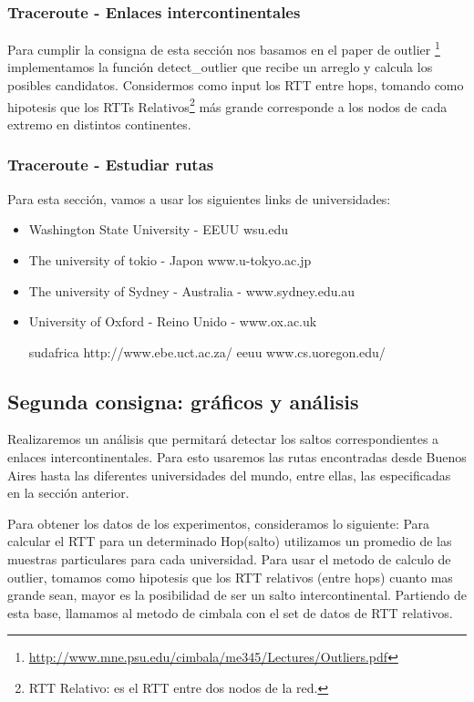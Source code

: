 \subsubsection{Traceroute - Enlaces intercontinentales}

Para cumplir la consigna de esta sección nos basamos en el paper de outlier \footnote{ \hyperref[Cimbala]{http://www.mne.psu.edu/cimbala/me345/Lectures/Outliers.pdf} } implementamos la función detect\_outlier que recibe un arreglo y calcula los posibles candidatos. Considermos como input los RTT entre hops, tomando como hipotesis que los RTTs Relativos\footnote{RTT Relativo: es el RTT entre dos nodos de la red.} más grande corresponde a los nodos de cada extremo en distintos continentes.

\subsubsection{Traceroute - Estudiar rutas}

Para esta sección, vamos a usar los siguientes links de universidades:

\begin{itemize}
\item Washington State University - EEUU wsu.edu
\item The university of tokio - Japon www.u-tokyo.ac.jp
\item The university of Sydney - Australia - www.sydney.edu.au
\item University of Oxford - Reino Unido - www.ox.ac.uk

sudafrica http://www.ebe.uct.ac.za/
eeuu www.cs.uoregon.edu/

\end{itemize}

\subsection{Segunda consigna: gráficos y análisis}


Realizaremos un análisis que permitará detectar los saltos correspondientes a enlaces intercontinentales. Para esto usaremos las rutas encontradas desde Buenos Aires hasta las diferentes universidades del mundo, entre ellas, las especificadas en la sección anterior.

Para obtener los datos de los experimentos, consideramos lo siguiente:
Para calcular el RTT para un determinado Hop(salto) utilizamos un promedio de las muestras particulares para cada universidad.
Para usar el metodo de calculo de outlier, tomamos como hipotesis que los RTT relativos (entre hops) cuanto mas grande sean, mayor es la posibilidad de ser un salto intercontinental. Partiendo de esta base, llamamos al metodo de cimbala con el set de datos de RTT relativos.

